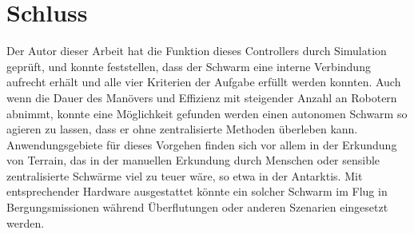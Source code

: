 \section{Schluss}

Der Autor dieser Arbeit hat die Funktion dieses Controllers durch Simulation geprüft, und konnte feststellen,
dass der Schwarm eine interne Verbindung aufrecht erhält und alle vier Kriterien der Aufgabe erfüllt werden
konnten. Auch wenn die Dauer des Manövers und Effizienz mit steigender Anzahl an Robotern abnimmt, konnte
eine Möglichkeit gefunden werden einen autonomen Schwarm so agieren zu lassen, dass er ohne zentralisierte
Methoden überleben kann. Anwendungsgebiete für dieses Vorgehen finden sich vor allem in der Erkundung von
Terrain, das in der manuellen Erkundung durch Menschen oder sensible zentralisierte Schwärme viel zu teuer 
wäre, so etwa in der Antarktis. Mit entsprechender Hardware ausgestattet könnte ein solcher Schwarm im Flug
in Bergungsmissionen während Überflutungen oder anderen Szenarien eingesetzt werden.